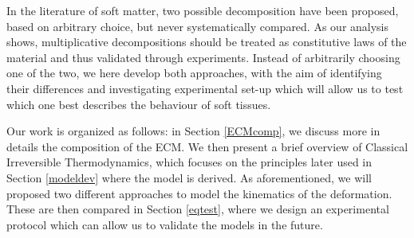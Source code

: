 In the literature of soft matter, two possible decomposition have been proposed, based on arbitrary choice, but never systematically compared. As our analysis shows, multiplicative decompositions should be treated as constitutive laws of the material and thus validated through experiments. Instead of arbitrarily choosing one of the two, we here develop both approaches, with the aim of identifying their differences and investigating experimental set-up which will allow us to test which one best describes the behaviour of soft tissues.  

Our work is organized as follows: in Section \ref{ECMcomp}, we discuss more in details the composition of the ECM. We then present a brief overview of Classical Irreversible Thermodynamics, which focuses on the principles later used in Section \ref{modeldev} where the model is derived. As aforementioned, we will proposed two different approaches to model the kinematics of the deformation. These are then compared in Section \ref{eqtest}, where we design an experimental protocol which can allow us to validate the models in the future. 